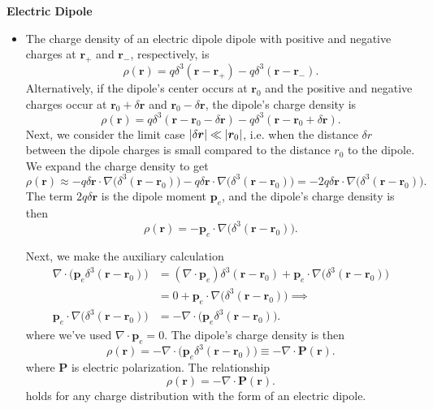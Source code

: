 \documentclass[11pt, a4paper]{article}
\renewcommand{\vec}[1]{\bm{#1}} %
\renewcommand{\r}{\vec{r}}
\newcommand{\pe}{\vec{p}_{e}}  %
\renewcommand{\div}{\nabla \cdot}
\renewcommand{\grad}{\nabla}
\begin{document}
\textbf{Electric Dipole} 
\begin{itemize}
	\item The charge density of an electric dipole dipole with positive and negative charges at $ \r_{+} $ and $ \r_{-} $, respectively, is
	\begin{equation*}
		\rho(\r) = q \delta^{3}(\r - \r_{+}) - q \delta^{3}(\r - \r_{-}).
	\end{equation*}
	Alternatively, if the dipole's center occurs at $ \r_{0} $ and the positive and negative charges occur at $ \r_{0} + \delta \r$ and $ \r_{0} - \delta \r $, the dipole's charge density is
	\begin{equation*}
		\rho(\r) = q \delta^{3}(\r - \r_{0} - \delta \r) - q\delta^{3}(\r - \r_{0} + \delta \r).
	\end{equation*}
	Next, we consider the limit case $ \abs{\delta \r} \ll \abs{\r_{0}} $, i.e. when the distance $ \delta r $ between the dipole charges is small compared to the distance $ r_{0} $ to the dipole. We expand the charge density to get
	\begin{equation*}
		\rho(\r) \approx - q \delta \r \cdot \grad \big(\delta^{3}(\r - \r_{0})\big) - q \delta \r \cdot \grad \big(\delta^{3}(\r - \r_{0})\big) = -2 q \delta \r \cdot \grad \big(\delta^{3}(\r - \r_{0})\big).
	\end{equation*}
	The term $ 2q\delta \r $ is the dipole moment $ \pe $, and the dipole's charge density is then
	\begin{equation*}
		\rho(\r) = -\pe \cdot \grad \big(\delta^{3}(\r - \r_{0})\big).
	\end{equation*}

	Next, we make the auxiliary calculation
	\begin{align*}
		\div \big(\pe \delta^{3}(\r - \r_{0})\big) &= (\div \pe) \delta^{3}(\r - \r_{0}) + \pe \cdot \grad \big(\delta^{3}(\r - \r_{0})\big) \\
		&= 0 + \pe \cdot \grad \big(\delta^{3}(\r - \r_{0})\big)  \implies \\
		\pe \cdot \grad \big(\delta^{3}(\r - \r_{0})\big)  & = - \div \big(\pe \delta^{3}(\r - \r_{0})\big).
	\end{align*}
	where we've used $ \div \pe = 0 $. The dipole's charge density is then
	\begin{equation*}
		\rho(\r) = - \div \big(\pe \delta^{3}(\r - \r_{0})\big) \equiv - \div \vec{P}(\r).
	\end{equation*}
	where $ \vec{P} $ is electric polarization. The relationship 
	\begin{equation*}
		\rho(\r) = - \div \vec{P}(\r).
	\end{equation*}
	holds for any charge distribution with the form of an electric dipole.
\end{itemize}
\end{document}
